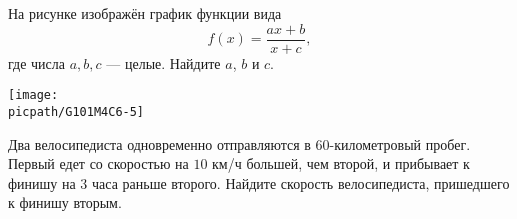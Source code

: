 \begin{exam}
\begin{listofex}
		\item
		\begin{minipage}[t]{\bodywidth}
			На рисунке изображён график функции вида \[ f(x)=\dfrac{ax+b}{x+c}, \] где числа \(a, b, c\) --- целые. Найдите \( a \), \( b \) и \( c \).
		\end{minipage}
		\hspace{0.02\linewidth}
		\begin{minipage}[t]{\picwidth}
			\texttt{[image: \\picpath/G101M4C6-5]}
		\end{minipage}
		\newpage
		\item Два велосипедиста одновременно отправляются в \( 60 \)-километровый пробег. Первый едет со скоростью на \( 10 \) км/ч большей, чем второй, и прибывает к финишу на \( 3 \) часа раньше второго. Найдите скорость велосипедиста, пришедшего к финишу вторым.
	\end{listofex}
\end{exam}